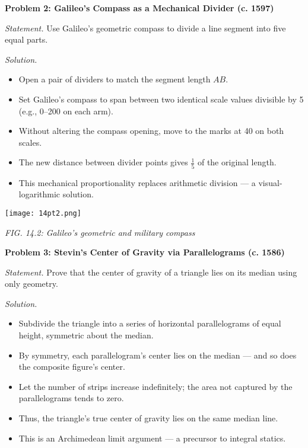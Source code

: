 \documentclass[9pt]{article}
\begin{document}
\newpage

\textbf{Problem 2: Galileo’s Compass as a Mechanical Divider (c. 1597)}

\textit{Statement.} Use Galileo’s geometric compass to divide a line segment into five equal parts.

\textit{Solution.}
\begin{itemize}
    \item Open a pair of dividers to match the segment length $AB$.
    \item Set Galileo’s compass to span between two identical scale values divisible by 5 (e.g., 0–200 on each arm).
    \item Without altering the compass opening, move to the marks at 40 on both scales.
    \item The new distance between divider points gives $\tfrac{1}{5}$ of the original length.
    \item This mechanical proportionality replaces arithmetic division — a visual-logarithmic solution.
\end{itemize}

\begin{center}
    \texttt{[image: 14pt2.png]}

    \textit{FIG. 14.2: Galileo’s geometric and military compass}
\end{center}

\newpage

\textbf{Problem 3: Stevin’s Center of Gravity via Parallelograms (c. 1586)}

\textit{Statement.} Prove that the center of gravity of a triangle lies on its median using only geometry.

\textit{Solution.}
\begin{itemize}
    \item Subdivide the triangle into a series of horizontal parallelograms of equal height, symmetric about the median.
    \item By symmetry, each parallelogram’s center lies on the median — and so does the composite figure’s center.
    \item Let the number of strips increase indefinitely; the area not captured by the parallelograms tends to zero.
    \item Thus, the triangle's true center of gravity lies on the same median line.
    \item This is an Archimedean limit argument — a precursor to integral statics.
\end{itemize}
\end{document}
